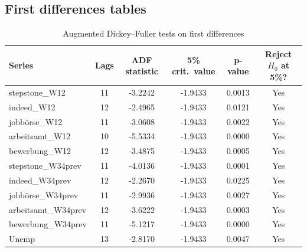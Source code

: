 \documentclass[12pt,a4paper]{article}
\begin{document}
\subsection{First differences tables}
\begin{table}[htbp]
\centering
\caption{Augmented Dickey--Fuller tests on first differences }
\label{tab:adf_diff1_n}
\begin{tabular}{lccccc}
\hline\hline
Series & Lags & ADF statistic & 5\% crit.\ value & p-value & Reject $H_0$ at 5\%? \\
\hline
stepstone\_W12      & 11 & -3.2242 & -1.9433 & 0.0013 & Yes \\
indeed\_W12         & 12 & -2.4965 & -1.9433 & 0.0121 & Yes \\
jobbörse\_W12       & 11 & -3.0608 & -1.9433 & 0.0022 & Yes \\
arbeitsamt\_W12     & 10 & -5.5334 & -1.9433 & 0.0000 & Yes \\
bewerbung\_W12      & 12 & -3.4875 & -1.9433 & 0.0005 & Yes \\
stepstone\_W34prev  & 11 & -4.0136 & -1.9433 & 0.0001 & Yes \\
indeed\_W34prev     & 12 & -2.2670 & -1.9433 & 0.0225 & Yes \\
jobbörse\_W34prev   & 11 & -2.9936 & -1.9433 & 0.0027 & Yes \\
arbeitsamt\_W34prev & 12 & -3.6222 & -1.9433 & 0.0003 & Yes \\
bewerbung\_W34prev  & 11 & -5.1217 & -1.9433 & 0.0000 & Yes \\
Unemp               & 13 & -2.8170 & -1.9433 & 0.0047 & Yes \\
\hline\hline
\end{tabular}
\end{table}
\end{document}
